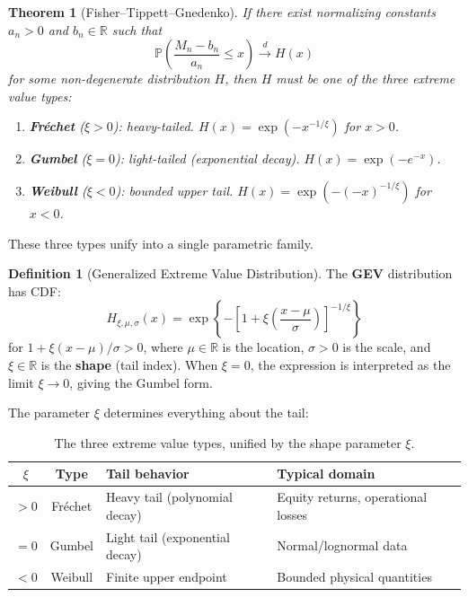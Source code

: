 \documentclass[11pt, a4paper]{article}
\theoremstyle{definition}
\newtheorem{definition}{Definition}[section]
\theoremstyle{plain}
\newtheorem{theorem}{Theorem}[section]
\theoremstyle{remark}
\newcommand{\PV}{\mathbb{P}}
\newcommand{\RV}{\mathbb{R}}
\begin{document}
\begin{theorem}[Fisher--Tippett--Gnedenko]\label{thm:ftg}
If there exist normalizing constants $a_n > 0$ and $b_n \in \RV$ such that
\[
    \PV\!\left(\frac{M_n - b_n}{a_n} \leq x\right) \xrightarrow{d} H(x)
\]
for some non-degenerate distribution $H$, then $H$ must be one of the three extreme value types:
\begin{enumerate}
    \item \textbf{Fr\'echet} ($\xi > 0$): heavy-tailed. $H(x) = \exp(-x^{-1/\xi})$ for $x > 0$.
    \item \textbf{Gumbel} ($\xi = 0$): light-tailed (exponential decay). $H(x) = \exp(-e^{-x})$.
    \item \textbf{Weibull} ($\xi < 0$): bounded upper tail. $H(x) = \exp(-(-x)^{-1/\xi})$ for $x < 0$.
\end{enumerate}
\end{theorem}

These three types unify into a single parametric family.

\begin{definition}[Generalized Extreme Value Distribution]
The \textbf{GEV} distribution has CDF:
\[
    H_{\xi, \mu, \sigma}(x) =
    \exp\!\left\{-\left[1 + \xi\left(\frac{x - \mu}{\sigma}\right)\right]^{-1/\xi}\right\}
\]
for $1 + \xi(x - \mu)/\sigma > 0$, where $\mu \in \RV$ is the location,
$\sigma > 0$ is the scale, and $\xi \in \RV$ is the \textbf{shape} (tail index).
When $\xi = 0$, the expression is interpreted as the limit $\xi \to 0$, giving the Gumbel form.
\end{definition}

The parameter $\xi$ determines everything about the tail:
\begin{table}[H]
\centering
\begin{tabular}{@{}ccll@{}}
\toprule
$\xi$ & \textbf{Type} & \textbf{Tail behavior} & \textbf{Typical domain} \\
\midrule
$> 0$ & Fr\'echet & Heavy tail (polynomial decay) & Equity returns, operational losses \\
$= 0$ & Gumbel & Light tail (exponential decay) & Normal/lognormal data \\
$< 0$ & Weibull & Finite upper endpoint & Bounded physical quantities \\
\bottomrule
\end{tabular}
\caption{The three extreme value types, unified by the shape parameter $\xi$.}
\end{table}
\end{document}
